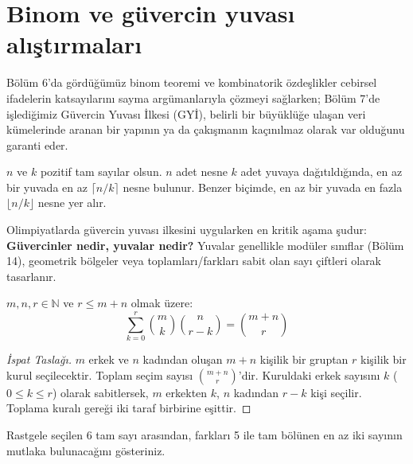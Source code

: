 \section{Binom ve güvercin yuvası alıştırmaları}

Bölüm 6'da gördüğümüz binom teoremi ve kombinatorik özdeşlikler cebirsel ifadelerin katsayılarını sayma argümanlarıyla çözmeyi sağlarken; Bölüm 7'de işlediğimiz Güvercin Yuvası İlkesi (GYİ), belirli bir büyüklüğe ulaşan veri kümelerinde aranan bir yapının ya da çakışmanın kaçınılmaz olarak var olduğunu garanti eder.

\begin{definition}
$n$ ve $k$ pozitif tam sayılar olsun. $n$ adet nesne $k$ adet yuvaya dağıtıldığında, en az bir yuvada en az $\lceil n/k \rceil$ nesne bulunur. Benzer biçimde, en az bir yuvada en fazla $\lfloor n/k \rfloor$ nesne yer alır.
\end{definition}

Olimpiyatlarda güvercin yuvası ilkesini uygularken en kritik aşama şudur: \textbf{Güvercinler nedir, yuvalar nedir?} Yuvalar genellikle modüler sınıflar (Bölüm 14), geometrik bölgeler veya toplamları/farkları sabit olan sayı çiftleri olarak tasarlanır.

\begin{theorem}
$m, n, r \in \mathbb{N}$ ve $r \le m+n$ olmak üzere:
\[
\sum_{k=0}^r \binom{m}{k} \binom{n}{r-k} = \binom{m+n}{r}
\]
\end{theorem}

\begin{proof}[İspat Taslağı]
$m$ erkek ve $n$ kadından oluşan $m+n$ kişilik bir gruptan $r$ kişilik bir kurul seçilecektir. Toplam seçim sayısı $\binom{m+n}{r}$'dir. Kuruldaki erkek sayısını $k$ ($0 \le k \le r$) olarak sabitlersek, $m$ erkekten $k$, $n$ kadından $r-k$ kişi seçilir. Toplama kuralı gereği iki taraf birbirine eşittir.
\end{proof}

\begin{example}
Rastgele seçilen 6 tam sayı arasından, farkları 5 ile tam bölünen en az iki sayının mutlaka bulunacağını gösteriniz.
\end{example}

